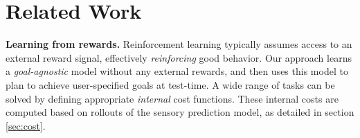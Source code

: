 \section{Related Work}\label{sec:rel_work}

\textbf{Learning from rewards.}
Reinforcement learning typically assumes access to an external reward signal, effectively \emph{reinforcing} good behavior. Our approach learns a \emph{goal-agnostic} model without any external rewards, and then uses this model to plan to achieve user-specified goals at test-time.
A wide range of tasks can be solved by defining appropriate \emph{internal} cost functions. These internal costs are computed based on rollouts of the sensory prediction model, as detailed in section \ref{sec:cost}.


